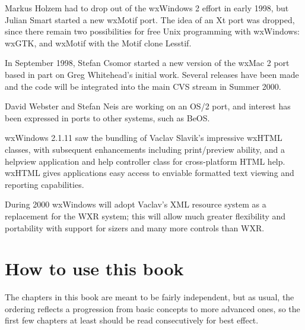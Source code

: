 Markus Holzem had to drop out of the wxWindows 2 effort in early
1998, but Julian Smart started a new wxMotif port. The idea of
an Xt port was dropped, since there remain two possibilities for
free Unix programming with wxWindows: wxGTK, and wxMotif with
the Motif clone Lesstif.

In September 1998, Stefan Csomor started a new version of the
wxMac 2 port based in part on Greg Whitehead's initial work.
Several releases have been made and the code will be integrated
into the main CVS stream in Summer 2000.

David Webster and Stefan Neis are working on an OS/2 port, and
interest has been expressed in ports to other systems, such as
BeOS.

wxWindows 2.1.11 saw the bundling of Vaclav Slavik's impressive
wxHTML classes, with subsequent enhancements including
print/preview ability, and a helpview application and help
controller class for cross-platform HTML help. wxHTML gives
applications easy access to enviable formatted text viewing and
reporting capabilities.

During 2000 wxWindows will adopt Vaclav's XML resource system
as a replacement for the WXR system; this will allow much
greater flexibility and portability with support for
sizers and many more controls than WXR.

\section{How to use this book}

The chapters in this book are meant to be fairly independent, but
as usual, the ordering reflects a progression from basic concepts
to more advanced ones, so the first few chapters at least
should be read consecutively for best effect.

